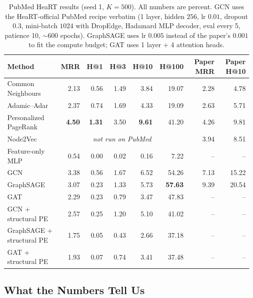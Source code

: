 \documentclass[10pt,a4paper]{article}
\begin{document}
\begin{table}[t]
\centering
\small
\caption{PubMed HeaRT results (seed 1, $K=500$). All numbers are percent.
GCN uses the HeaRT-official PubMed recipe verbatim (1 layer, hidden
$256$, lr $0.01$, dropout $0.3$, mini-batch $1024$ with DropEdge,
Hadamard MLP decoder, eval every 5, patience 10, $\sim$600 epochs).
GraphSAGE uses lr $0.005$ instead of the paper's $0.001$ to fit the
compute budget; GAT uses 1 layer + 4 attention heads.}
\label{tab:pubmed-results}
\begin{tabular}{@{}lrrrrr@{\hskip 1.2em}rr@{}}
\toprule
\textbf{Method} & \textbf{MRR} & \textbf{H@1} & \textbf{H@3} & \textbf{H@10} & \textbf{H@100} & \textbf{Paper MRR} & \textbf{Paper H@10}\\
\midrule
Common Neighbours      &  2.13 &  0.56 &  1.49 &  3.84 & 19.07 & 2.28 &  4.78\\
Adamic--Adar           &  2.37 &  0.74 &  1.69 &  4.33 & 19.09 & 2.63 &  5.71\\
Personalized PageRank  & \textbf{4.50} & \textbf{1.31} &  3.50 & \textbf{9.61} & 41.20 & 4.26 &  9.81\\
Node2Vec               & \multicolumn{5}{c}{\textit{not run on PubMed}} & 3.94 &  8.51\\
Feature-only MLP       &  0.54 &  0.00 &  0.02 &  0.16 &  7.22 & --   & --\\
GCN                    &  3.38 &  0.56 &  1.67 &  6.52 & 54.26 & 7.13 & 15.22\\
GraphSAGE              &  3.07 &  0.23 &  1.33 &  5.73 & \textbf{57.63} & 9.39 & 20.54\\
GAT                    &  2.29 &  0.23 &  0.79 &  3.47 & 47.83 & --   & --\\
GCN + structural PE    &  2.57 &  0.25 &  1.20 &  5.10 & 41.02 & --   & --\\
GraphSAGE + structural PE & 1.75 & 0.05 & 0.43 & 2.66 & 37.18 & --   & --\\
GAT + structural PE    &  1.93 &  0.07 &  0.74 &  3.41 & 37.48 & --   & --\\
\bottomrule
\end{tabular}
\end{table}

\subsection{What the Numbers Tell Us}
\end{document}
